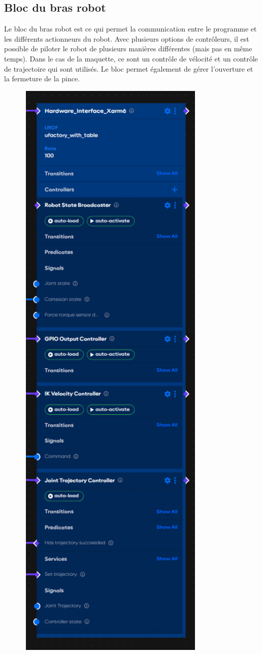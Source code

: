 \subsection{Bloc du bras robot}

Le bloc du bras robot est ce qui permet la communication entre le programme et les différents actionneurs du robot. Avec plusieurs options de contrôleurs, il est possible de piloter le robot de plusieurs manières différentes (mais pas en même temps). Dans le cas de la maquette, ce sont un contrôle de vélocité et un contrôle de trajectoire qui sont utilisés. Le bloc permet également de gérer l'ouverture et la fermeture de la pince.

\begin{figure}[H]
    \centering
    \includegraphics[width=0.8\textwidth]{assets/figures/AICA_Hardware_interface.png}

\end{figure}
